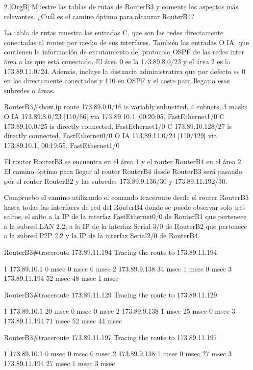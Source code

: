 \begin{ejer}
2.[OrgB] Muestre las tablas de rutas de RouterB3 y comente los aspectos más
relevantes. ¿Cuál es el camino óptimo para alcanzar RouterB4?
\end{ejer}
\par La tabla de rutas muestra las entradas C, que son las redes directamente conectadas al router por medio de sus interfaces. También las entradas O IA, que contienen la información de enrutamiento del protocolo OSPF de las redes inter área a las que está conectado. El área 0 es la 173.89.8.0/23 y el área 2 es la 173.89.11.0/24. Además, incluye la distancia administrativa que por defecto es 0 en las directamente conectadas y 110 en OSPF y el coste para llegar a esas subredes o áreas.

\begin{listing}[style=consola]
RouterB3#show ip route
	173.89.0.0/16 is variably subnetted, 4 subnets, 3 masks
O IA    173.89.8.0/23 [110/66] via 173.89.10.1, 00:20:05, FastEthernet1/0
C       173.89.10.0/25 is directly connected, FastEthernet1/0
C       173.89.10.128/27 is directly connected, FastEthernet0/0
O IA    173.89.11.0/24 [110/129] via 173.89.10.1, 00:19:55, FastEthernet1/0
\end{listing}

\par El router RouterB3 se encuentra en el área 1 y el router RouterB4 en el área 2. El camino óptimo para llegar al router RouterB4 desde RouterB3 será pasando por el router RouterB2 y las subredes 173.89.9.136/30 y 173.89.11.192/30.
\par Compruebo el camino utilizando el comando traceroute desde el router RouterB3 hasta todas las interfaces de red del RouterB4 donde se puede observar solo tres saltos, el salto a la IP de la interfaz FastEthernet0/0 de RouterB1 que pertenece a la subred LAN 2.2, a la IP de la interfaz Serial 3/0 de RouterB2 que pertenece a la subred P2P 2.2 y la IP de la interfaz Serial2/0 de RouterB4.
\begin{listing}[style=consola]
RouterB3#traceroute 173.89.11.194
Tracing the route to 173.89.11.194

  1   173.89.10.1     0 msec    0 msec    0 msec    
  2   173.89.9.138    34 msec   1 msec    0 msec    
  3   173.89.11.194   52 msec   48 msec   1 msec    
  
RouterB3#traceroute 173.89.11.129
Tracing the route to 173.89.11.129

  1   173.89.10.1     20 msec   0 msec    0 msec    
  2   173.89.9.138    1 msec    25 msec   0 msec    
  3   173.89.11.194   71 msec   52 msec   44 msec   
  
RouterB3#traceroute 173.89.11.197
Tracing the route to 173.89.11.197

  1   173.89.10.1     0 msec    0 msec    0 msec    
  2   173.89.9.138    1 msec    0 msec    27 msec   
  3   173.89.11.194   27 msec   1 msec    3 msec  
\end{listing}


